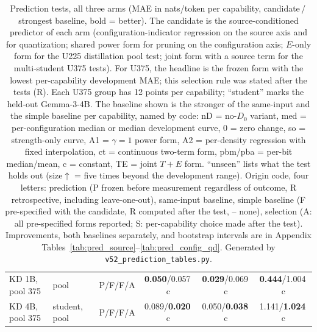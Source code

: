 \begin{table}[!t]
\begin{tabular}{@{}>{\raggedright\arraybackslash}p{4.15cm}>{\raggedright\arraybackslash}p{1.4cm}lccc@{}}
KD 1B, pool 375 & pool & P/F/F/A & \textbf{0.050}/0.057{\scriptsize\,c} & \textbf{0.029}/0.069{\scriptsize\,c} & \textbf{0.444}/1.004{\scriptsize\,c} \\
KD 4B, pool 375 & student, pool & P/F/F/A & 0.089/\textbf{0.020}{\scriptsize\,c} & 0.050/\textbf{0.038}{\scriptsize\,c} & 1.141/\textbf{1.024}{\scriptsize\,c} \\
\bottomrule\end{tabular}
\caption{\scriptsize Prediction tests, all three arms (MAE in nats/token per capability, candidate\,/\,strongest baseline, bold = better). The candidate is the source-conditioned predictor of each arm (configuration-indicator regression on the source axis and for quantization; shared power form for pruning on the configuration axis; $E$-only form for the U225 distillation pool test; joint form with a source term for the multi-student U375 tests). For U375, the headline is the frozen form with the lowest per-capability development MAE; this selection rule was stated after the tests (R). Each U375 group has 12 points per capability; ``student'' marks the held-out Gemma-3-4B. The baseline shown is the stronger of the same-input and the simple baseline per capability, named by code: nD = no-$D_0$ variant, med = per-configuration median or median development curve, 0 = zero change, so = strength-only curve, A1 = $\gamma{=}1$ power form, A2 = per-density regression with fixed interpolation, ct = continuous two-term form, pbm/pba = per-bit median/mean, c = constant, TE = joint $T{+}E$ form. ``unseen'' lists what the test holds out (size$\uparrow$ = five times beyond the development range). Origin code, four letters: prediction (P frozen before measurement regardless of outcome, R retrospective, including leave-one-out), same-input baseline, simple baseline (F pre-specified with the candidate, R computed after the test, -- none), selection (A: all pre-specified forms reported; S: per-capability choice made after the test). Improvements, both baselines separately, and bootstrap intervals are in Appendix Tables~\ref{tab:pred_source}--\ref{tab:pred_config_qd}. Generated by \texttt{v52\_prediction\_tables.py}.}
\label{tab:pred_main}\end{table}
